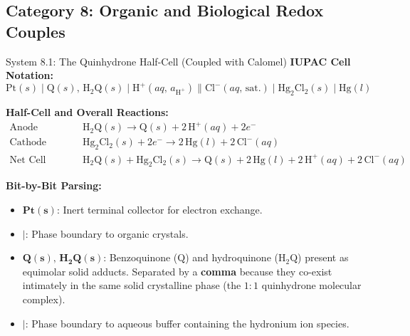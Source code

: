 \documentclass[10pt,a4paper]{article}
\begin{document}
\subsection{Category 8: Organic and Biological Redox Couples}
\begin{examplebox}{System 8.1: The Quinhydrone Half-Cell (Coupled with Calomel)}
\textbf{IUPAC Cell Notation:}
\begin{equation*}
    \text{Pt}(s) \mid \text{Q}(s),\, \text{H}_2\text{Q}(s) \mid \text{H}^+(aq,\, a_{\text{H}^+}) \parallel \text{Cl}^-(aq,\, \text{sat.}) \mid \text{Hg}_2\text{Cl}_2(s) \mid \text{Hg}(l)
\end{equation*}

\textbf{Half-Cell and Overall Reactions:}
\begin{align*}
    \text{Anode (Oxidation):} \quad & \text{H}_2\text{Q}(s) \longrightarrow \text{Q}(s) + 2\,\text{H}^+(aq) + 2e^- \\
    \text{Cathode (Reduction):} \quad & \text{Hg}_2\text{Cl}_2(s) + 2e^- \longrightarrow 2\,\text{Hg}(l) + 2\,\text{Cl}^-(aq) \\
    \text{Net Cell Reaction:} \quad & \text{H}_2\text{Q}(s) + \text{Hg}_2\text{Cl}_2(s) \longrightarrow \text{Q}(s) + 2\,\text{Hg}(l) + 2\,\text{H}^+(aq) + 2\,\text{Cl}^-(aq)
\end{align*}

\textbf{Bit-by-Bit Parsing:}
\begin{itemize}[leftmargin=*]
    \item $\mathbf{Pt(s)}$: Inert terminal collector for electron exchange.
    \item $\mathbf{\mid}$: Phase boundary to organic crystals.
    \item $\mathbf{Q(s),\, H_2Q(s)}$: Benzoquinone ($\text{Q}$) and hydroquinone ($\text{H}_2\text{Q}$) present as equimolar solid adducts. Separated by a \textbf{comma} because they co-exist intimately in the same solid crystalline phase (the $1:1$ quinhydrone molecular complex).
    \item $\mathbf{\mid}$: Phase boundary to aqueous buffer containing the hydronium ion species.
\end{itemize}
\end{examplebox}

\end{document}
